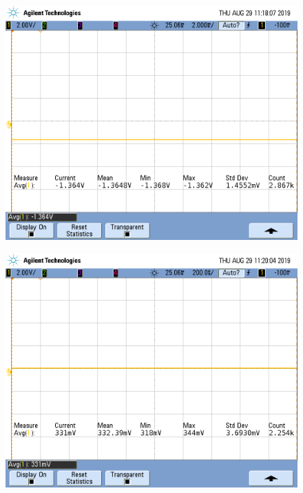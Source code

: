 \begin{figure}[H]
\centering
\begin{minipage}{.5\textwidth}
  \centering
  \includegraphics[width=.99\linewidth]{imagenes/RS1YRS2CORTOLF356capa.png}
  \label{fig:voutcapaLF356}
\end{minipage}%
\begin{minipage}{.5\textwidth}
  \centering
  \includegraphics[width=.99\linewidth]{imagenes/RS1Y2CortoCapaTL081.png}
  \label{fig:voutcapaTL081}
\end{minipage}
\end{figure}


